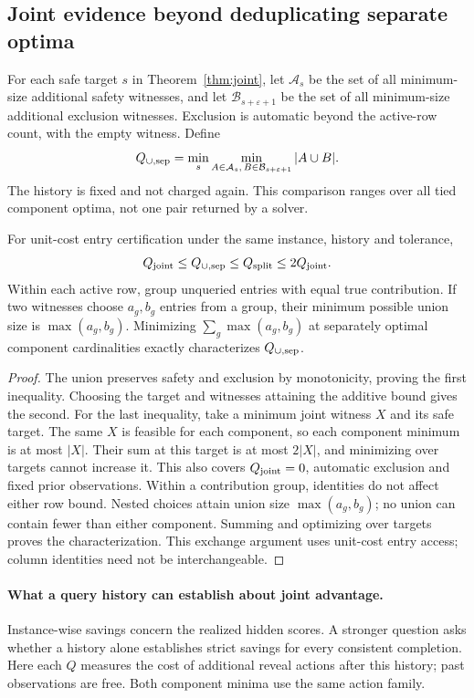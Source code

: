 \subsection{Joint evidence beyond deduplicating separate optima}
\label{app:deduplicated}
For each safe target $s$ in Theorem~\ref{thm:joint}, let $\mathcal A_s$ be the set of all minimum-size additional safety witnesses, and let $\mathcal B_{s+\varepsilon+1}$ be the set of all minimum-size additional exclusion witnesses. Exclusion is automatic beyond the active-row count, with the empty witness. Define
\[
 Q_{\cup,\rm sep}=\min_s\min_{A\in\mathcal A_s,\,B\in\mathcal B_{s+\varepsilon+1}}|A\cup B|.
\]
The history is fixed and not charged again. This comparison ranges over all tied component optima, not one pair returned by a solver.

\begin{proposition}
\label{prop:deduplicated}
For unit-cost entry certification under the same instance, history and tolerance,
\[
 Q_{\rm joint}\le Q_{\cup,\rm sep}\le Q_{\rm split}\le 2Q_{\rm joint}.
\]
Within each active row, group unqueried entries with equal true contribution. If two witnesses choose $a_g,b_g$ entries from a group, their minimum possible union size is $\max(a_g,b_g)$. Minimizing $\sum_g\max(a_g,b_g)$ at separately optimal component cardinalities exactly characterizes $Q_{\cup,\rm sep}$.
\end{proposition}
\begin{proof}
The union preserves safety and exclusion by monotonicity, proving the first inequality. Choosing the target and witnesses attaining the additive bound gives the second. For the last inequality, take a minimum joint witness $X$ and its safe target. The same $X$ is feasible for each component, so each component minimum is at most $|X|$. Their sum at this target is at most $2|X|$, and minimizing over targets cannot increase it. This also covers $Q_{\rm joint}=0$, automatic exclusion and fixed prior observations. Within a contribution group, identities do not affect either row bound. Nested choices attain union size $\max(a_g,b_g)$; no union can contain fewer than either component. Summing and optimizing over targets proves the characterization. This exchange argument uses unit-cost entry access; column identities need not be interchangeable.
\end{proof}


\paragraph{What a query history can establish about joint advantage.}
Instance-wise savings concern the realized hidden scores. A stronger question asks whether a history alone establishes strict savings for every consistent completion. Here each $Q$ measures the cost of additional reveal actions after this history; past observations are free. Both component minima use the same action family.

